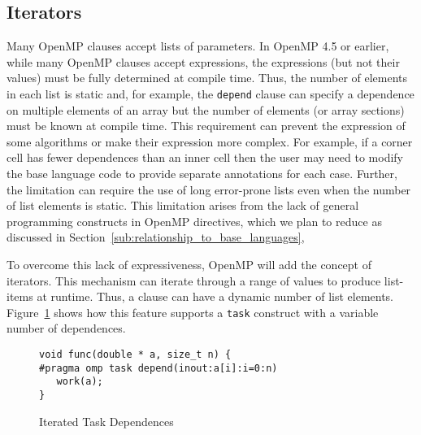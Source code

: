 \subsection{Iterators}
\label{sub:iterators}

Many OpenMP clauses accept lists of parameters. In OpenMP 4.5 or earlier, 
while many OpenMP clauses accept expressions, the expressions (but not 
their values) must be fully determined at compile time. Thus, the number 
of elements in each list is static and, for example, the \texttt{depend} 
clause can specify a dependence on multiple elements of an array but the 
number of elements (or array sections) must be known at compile time. This 
requirement can prevent the expression of some algorithms or make their 
expression more complex. For example, if a corner cell has fewer dependences 
than an inner cell then the user may need to modify the base language code 
to provide separate annotations for each case. Further, the limitation can 
require the use of long error-prone lists even when the number of list 
elements is static. This limitation arises from the lack of general 
programming constructs in OpenMP directives, which we plan to reduce as 
discussed in Section~\ref{sub:relationship_to_base_languages}, 

To overcome this lack of expressiveness, OpenMP will add the concept of
iterators. This mechanism can iterate through a range of values to produce 
list-items at runtime. Thus, a clause can have a dynamic number of list 
elements. Figure~\ref{fig:iterators} shows how this feature supports a
\texttt{task} construct with a variable number of dependences.

\begin{figure}
\begin{verbatim}
void func(double * a, size_t n) {
#pragma omp task depend(inout:a[i]:i=0:n)
   work(a);
}
\end{verbatim}
\caption{Iterated Task Dependences\label{fig:iterators}}
\end{figure}

